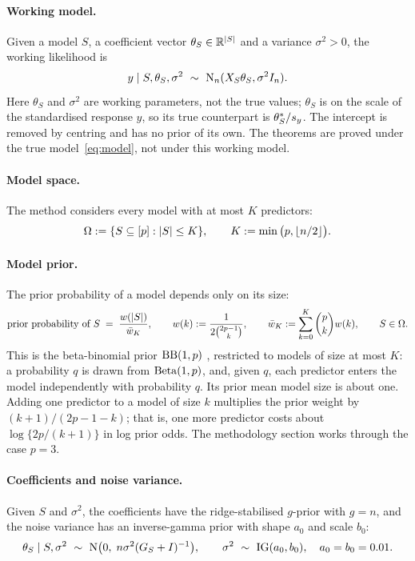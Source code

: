 \paragraph{Working model.} Given a model $S$, a coefficient vector $\theta_S\in\mathbb{R}^{\lvert S\rvert}$ and a variance
$\sigma^2>0$, the working likelihood is
\begin{equation}\label{eq:working}
  y\mid S,\theta_S,\sigma^2\ \sim\ \Normal_n(X_S\theta_S,\sigma^2I_n).
\end{equation}
Here $\theta_S$ and $\sigma^2$ are working parameters, not the true values; $\theta_S$ is on the scale of
the standardised response $y$, so its true counterpart is $\theta^*_S/s_y$. The intercept is removed by centring and has no
prior of its own. The theorems are proved under the true model~\eqref{eq:model}, not under this working model.

\paragraph{Model space.} The method considers every model with at most $K$ predictors:
\begin{equation}\label{eq:modelspace}
  \Omega:=\{S\subseteq[p]:\lvert S\rvert\le K\},\qquad K:=\min\big(p,\lfloor n/2\rfloor\big).
\end{equation}

\paragraph{Model prior.} The prior probability of a model depends only on its size:
\begin{equation}\label{eq:modelprior}
  \text{prior probability of }S\;=\;\frac{w(\lvert S\rvert)}{\bar w_K},\qquad w(k):=\frac{1}{2\binom{2p-1}{k}},\qquad \bar w_K:=\sum_{k=0}^{K}\binom{p}{k}w(k),\qquad
  S\in\Omega .
\end{equation}
This is the beta-binomial prior $\mathrm{BB}(1,p)$ \citep{ScottBerger2010}, restricted to models of size at most $K$: a
probability $q$ is drawn from $\mathrm{Beta}(1,p)$, and, given $q$, each predictor enters the model independently with
probability $q$. Its prior mean model size is about one. Adding one predictor to a model of size $k$ multiplies the
prior weight by $(k+1)/(2p-1-k)$; that is, one more predictor costs about $\log\{2p/(k+1)\}$ in log prior odds. The
methodology section works through the case $p=3$.

\paragraph{Coefficients and noise variance.} Given $S$ and $\sigma^2$, the coefficients have the ridge-stabilised
$g$-prior \citep{Zellner1986} with $g=n$, and the noise variance has an inverse-gamma prior with shape $a_0$ and scale
$b_0$:
\begin{equation}\label{eq:slab}
  \theta_S\mid S,\sigma^2\ \sim\ \Normal\big(0,\;n\sigma^2(G_S+I)^{-1}\big),\qquad
  \sigma^2\ \sim\ \IG(a_0,b_0),\quad a_0=b_0=0.01.
\end{equation}

